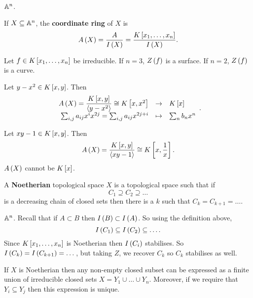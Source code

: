 \begin{example}
$ \A^n $.
\end{example}

\begin{definition}
If $ X \subseteq \A^n $, the \textbf{coordinate ring} of $ X $ is
$$ A\rb{X} = \dfrac{A}{I\rb{X}} = \dfrac{K\sb{x_1, \dots, x_n}}{I\rb{X}}. $$
\end{definition}


\begin{example}
Let $ f \in K\sb{x_1, \dots, x_n} $ be irreducible. If $ n = 3 $, $ Z\rb{f} $ is a surface. If $ n = 2 $, $ Z\rb{f} $ is a curve.
\end{example}

\begin{example}
Let $ y - x^2 \in K\sb{x, y} $. Then
$$ \function{A\rb{X} = \dfrac{K\sb{x, y}}{\ab{y - x^2}} \cong K\sb{x, x^2}}{K\sb{x}}{\sum_{i, j} a_{ij}x^ix^{2j} = \sum_{i, j} a_{ij}x^{2j + i}}{\sum_n b_nx^n}. $$
\end{example}

\begin{example}
Let $ xy - 1 \in K\sb{x, y} $. Then
$$ A\rb{X} = \dfrac{K\sb{x, y}}{\ab{xy - 1}} \cong K\sb{x, \dfrac{1}{x}}. $$
$ A\rb{X} $ cannot be $ K\sb{x} $.
\end{example}

\begin{definition}
A \textbf{Noetherian} topological space $ X $ is a topological space such that if
$$ C_1 \supseteq C_2 \supseteq \dots $$
is a decreasing chain of closed sets then there is a $ k $ such that $ C_k = C_{k + 1} = \dots $.
\end{definition}

\begin{example}
$ \A^n $. Recall that if $ A \subset B $ then $ I\rb{B} \subset I\rb{A} $. So using the definition above,
$$ I\rb{C_1} \subseteq I\rb{C_2} \subseteq \dots. $$
Since $ K\sb{x_1, \dots, x_n} $ is Noetherian then $ I\rb{C_i} $ stabilises. So $ I\rb{C_k} = I\rb{C_{k + 1}} = \dots $, but taking $ Z $, we recover $ C_k $ so $ C_k $ stabilises as well.
\end{example}

\begin{theorem}
If $ X $ is Noetherian then any non-empty closed subset can be expressed as a finite union of irreducible closed sets $ X = Y_1 \cup \dots \cup Y_n $. Moreover, if we require that $ Y_i \subseteq Y_j $ then this expression is unique.
\end{theorem}

